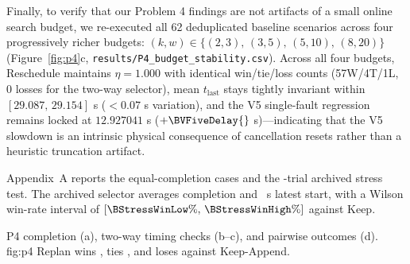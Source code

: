 Finally, to verify that our Problem 4 findings are not artifacts of a small online search budget, we re-executed all 62 deduplicated baseline scenarios across four progressively richer budgets: $(k,w)\in\{(2,3),\,(3,5),\,(5,10),\,(8,20)\}$ (Figure~\ref{fig:p4}c, \texttt{results/P4\_budget\_stability.csv}). Across all four budgets, Reschedule maintains $\eta=1.000$ with identical win/tie/loss counts (57W/4T/1L, 0 losses for the two-way selector), mean $t_{\mathrm{last}}$ stays tightly invariant within $[29.087,\,29.154]$ s ($<0.07$ s variation), and the V5 single-fault regression remains locked at $12.927041$ s ($+\BVFiveDelay{}$ s)—indicating that the V5 slowdown is an intrinsic physical consequence of cancellation resets rather than a heuristic truncation artifact.

Appendix~A reports the \BHoldCases{} equal-completion cases and the \BStressTrials{}-trial archived stress test. The archived selector averages \BStressSelectorEta{} completion and \BStressSelectorTime{}~s latest start, with a Wilson win-rate interval of $[\BStressWinLow\%,\,\BStressWinHigh\%]$ against Keep.

{P4 completion (a), two-way timing checks (b--c), and pairwise outcomes (d).}
{fig:p4}
{Replan wins \BReplanBeatsAppend{}, ties \BReplanTiesAppend{}, and loses \BReplanLosesAppend{} against Keep-Append.}
